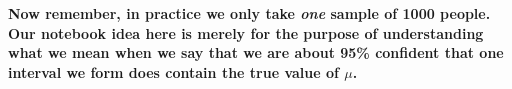 
{\bf Now remember, in practice we only take {\it one} sample of 1000
people.  Our notebook idea here is merely for the purpose of
understanding what we mean when we say that we are about 95\% confident
that one interval we form does contain the true value of $\mu$.}

% 
% 
% 
% 
% 
